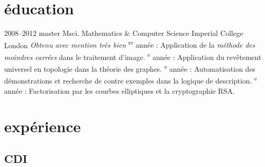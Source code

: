 \documentclass[]{friggeri-cv} %
\begin{document}

\section{éducation}

\begin{entrylist}


\entry
{2008--2012}
{master {\normalfont Msci. Mathematics \& Computer Science}}
{Imperial College London}
{
    \emph{Obtenu avec mention très bien}
	\textsuperscript{re} année : Application de la \emph{méthode des moindres carrées} dans le traitement d’image.
	\textsuperscript{e} année : Application du revêtement universel en topologie dans la théorie des graphes.
	\textsuperscript{e} année : Automatisation des démonstrations et recherche de contre exemples dans la logique de description.
	\textsuperscript{e} année : Factorisation par les courbes elliptiques et la cryptographie RSA.
}


\end{entrylist}


\section{expérience}

\subsection{CDI}
\end{document}
